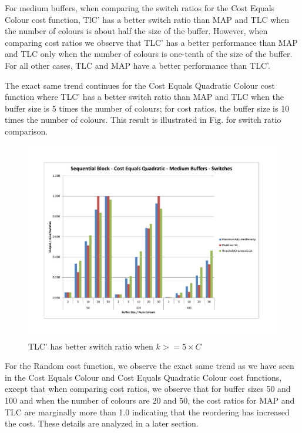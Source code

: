 For medium buffers, when comparing the switch ratios for the Cost Equals Colour cost function, TlC' has a better switch ratio than MAP and TLC when the number of colours is about half the size of the buffer. However, when comparing cost ratios we observe that TLC' has a better performance than MAP and TLC only when the number of colours is one-tenth of the size of the buffer. For all other cases,  TLC and MAP have a better performance than TLC'.

The exact same trend continues for the Cost Equals Quadratic Colour cost function where TLC' has a better switch ratio than MAP and TLC when the buffer size is 5 times the number of colours; for cost ratios, the buffer size is 10 times the number of colours. This result is illustrated in Fig. for switch ratio comparison. 

\begin{figure}[ht]
\centering 
\includegraphics[scale=0.60]{Sequential-Block-cq-medium-switches.pdf}
\caption{TLC' has better switch ratio when $k >= 5 \times C$}
\label{sequentialBlockCQMediumSwitches}
\end{figure}   

For the Random cost function, we observe the exact same trend as we have seen in the Cost Equals Colour and Cost Equals Quadratic Colour cost functions, except that when comparing cost ratios, we observe that for buffer sizes 50 and 100 and when the number of colours are 20 and 50, the cost ratios for MAP and TLC are marginally more than 1.0 indicating that the reordering has increased the cost. These details are analyzed in a later section. 

